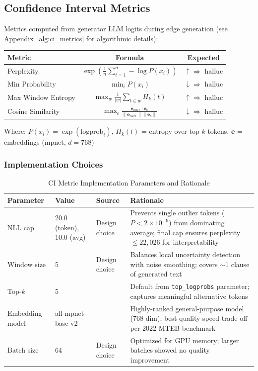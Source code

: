 \subsection{Confidence Interval Metrics}
Metrics computed from generator LLM logits during edge generation (see Appendix~\ref{alg:ci_metrics} for algorithmic details):

\begin{table}[H]
\centering
\footnotesize
\begin{tabular}{@{}lcc@{}}
\toprule
\textbf{Metric} & \textbf{Formula} & \textbf{Expected} \\
\midrule
Perplexity & $\displaystyle\exp\left(\frac{1}{n}\sum_{i=1}^{n} -\log P(x_i)\right)$ & $\uparrow \Rightarrow$ halluc \\[1.5ex]
Min Probability & $\displaystyle\min_i P(x_i)$ & $\downarrow \Rightarrow$ halluc \\[1.5ex]
Max Window Entropy & $\displaystyle\max_w \frac{1}{|w|} \sum_{t \in w} H_k(t)$ & $\uparrow \Rightarrow$ halluc \\[1.5ex]
Cosine Similarity & $\displaystyle\max_c \frac{\mathbf{e}_{narr} \cdot \mathbf{e}_c}{\|\mathbf{e}_{narr}\| \|\mathbf{e}_c\|}$ & $\downarrow \Rightarrow$ halluc \\
\bottomrule
\end{tabular}
\end{table}

Where: $P(x_i) = \exp(\text{logprob}_i)$, $H_k(t)$ = entropy over top-$k$ tokens, $\mathbf{e}$ = embeddings (mpnet, $d=768$)

\subsubsection{Implementation Choices}

\begin{table}[H]
\centering
\caption{CI Metric Implementation Parameters and Rationale}
\label{tab:ci_params}
\footnotesize
\begin{tabularx}{\textwidth}{@{}l l l X@{}}
\toprule
\textbf{Parameter} & \textbf{Value} & \textbf{Source} & \textbf{Rationale} \\
\midrule
NLL cap & 20.0 (token), 10.0 (avg) & Design choice & Prevents single outlier tokens ($P < 2 \times 10^{-9}$) from dominating average; final cap ensures perplexity $\leq 22{,}026$ for interpretability \\
Window size & 5 & Design choice & Balances local uncertainty detection with noise smoothing; covers $\sim$1 clause of generated text \\
Top-$k$ & 5 & \cite{openai2024api} & Default from \texttt{top\_logprobs} parameter; captures meaningful alternative tokens \\
Embedding model & all-mpnet-base-v2 & \cite{muennighoff2023mteb} & Highly-ranked general-purpose model (768-dim); best quality-speed trade-off per 2022 MTEB benchmark \\
Batch size & 64 & Design choice & Optimized for GPU memory; larger batches showed no quality improvement \\
\bottomrule
\end{tabularx}
\end{table}


